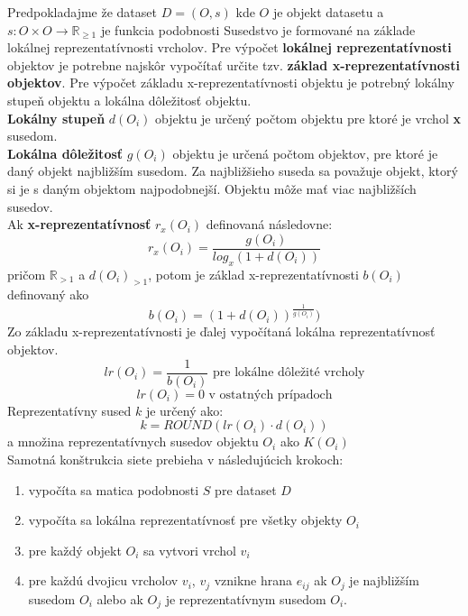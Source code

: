 \documentclass[slovak,master,dept460,male,cpp,cpdeclaration]{diploma}
\begin{document}
Predpokladajme že dataset $D=(O, s)$ kde $O$ je objekt datasetu a $s:O\times O\rightarrow  \mathbb{R}_{\geq{1}}$ je funkcia podobnosti
Susedstvo je formované na základe lokálnej reprezentatívnosti vrcholov. Pre výpočet\textbf{ lokálnej reprezentatívnosti} objektov je potrebne najskôr vypočítať určite tzv. \textbf{základ x-reprezentatívnosti objektov}. Pre výpočet základu x-reprezentatívnosti objektu je potrebný lokálny stupeň objektu a lokálna dôležitosť objektu. \\
\textbf{Lokálny stupeň} $d(O_i)$  objektu je určený počtom objektu pre ktoré je vrchol \textbf{x} susedom. \\
\textbf{Lokálna dôležitosť} $g(O_i)$ objektu je určená počtom objektov, pre ktoré je daný objekt najbližším susedom. Za najbližšieho suseda sa považuje objekt, ktorý si je s daným objektom najpodobnejší. Objektu môže mať viac najbližších susedov. \\
Ak \textbf{x-reprezentatívnosť} $r_x(O_i)$ definovaná následovne:
\begin{equation}
    r_x(O_i) =  \frac {g(O_i)} {log_x(1+ d(O_i))}
\end{equation}
pričom $\mathbb{R}_{>{1}}$ a $d(O_i)_{>{1}}$, potom je základ x-reprezentatívnosti $b(O_i)$ definovaný ako
\begin{equation}
    b(O_i)=(1+d(O_i))^\frac{1}{g(O_i)})
\end{equation}
Zo základu x-reprezentatívnosti je ďalej vypočítaná lokálna reprezentatívnosť objektov.
\begin{equation}
    lr(O_i)=\frac{1}{b(O_i)}  \text{ pre lokálne dôležité vrcholy}
\end{equation} 
\begin{equation}
    lr(O_i)=0  \text{ v ostatných prípadoch}
\end{equation} 
Reprezentatívny sused $k$ je určený ako:
\begin{equation}
    k = ROUND (lr(O_i) \cdot d(O_i))
\end{equation}
a množina reprezentatívnych susedov objektu $O_i$ ako $K(O_i)$
\\
Samotná konštrukcia siete prebieha v následujúcich krokoch:
\begin{enumerate}
\item vypočíta sa matica podobnosti $S$ pre dataset $D$
\item vypočíta sa lokálna reprezentatívnosť pre všetky objekty $O_i$
\item pre každý objekt $O_i$  sa vytvori vrchol $v_i$
\item pre každú dvojicu vrcholov $v_i$, $v_j$ vznikne hrana $e_{ij}$ ak $O_j$ je najbližším susedom $O_i$ alebo ak $O_j$ je reprezentatívnym susedom $O_i$.
\end{enumerate}
\end{document}
